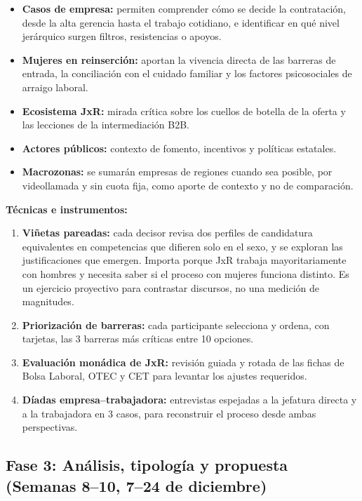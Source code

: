 \begin{itemize}
    \item \textbf{Casos de empresa:} permiten comprender cómo se decide la contratación, desde la alta gerencia hasta el trabajo cotidiano, e identificar en qué nivel jerárquico surgen filtros, resistencias o apoyos.
    \item \textbf{Mujeres en reinserción:} aportan la vivencia directa de las barreras de entrada, la conciliación con el cuidado familiar y los factores psicosociales de arraigo laboral.
    \item \textbf{Ecosistema JxR:} mirada crítica sobre los cuellos de botella de la oferta y las lecciones de la intermediación B2B.
    \item \textbf{Actores públicos:} contexto de fomento, incentivos y políticas estatales.
    \item \textbf{Macrozonas:} se sumarán empresas de regiones cuando sea posible, por videollamada y sin cuota fija, como aporte de contexto y no de comparación.
\end{itemize}

\textbf{Técnicas e instrumentos:}

\begin{enumerate}
    \item \textbf{Viñetas pareadas:} cada decisor revisa dos perfiles de candidatura equivalentes en competencias que difieren solo en el sexo, y se exploran las justificaciones que emergen. Importa porque JxR trabaja mayoritariamente con hombres y necesita saber si el proceso con mujeres funciona distinto. Es un ejercicio proyectivo para contrastar discursos, no una medición de magnitudes.
    \item \textbf{Priorización de barreras:} cada participante selecciona y ordena, con tarjetas, las 3 barreras más críticas entre 10 opciones.
    \item \textbf{Evaluación monádica de JxR:} revisión guiada y rotada de las fichas de Bolsa Laboral, OTEC y CET para levantar los ajustes requeridos.
    \item \textbf{Díadas empresa--trabajadora:} entrevistas espejadas a la jefatura directa y a la trabajadora en 3 casos, para reconstruir el proceso desde ambas perspectivas.
\end{enumerate}

\subsection{Fase 3: Análisis, tipología y propuesta (Semanas 8--10, 7--24 de diciembre)}

